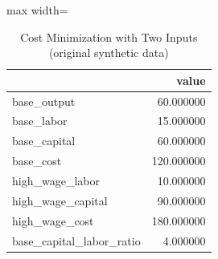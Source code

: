 \begin{table}[htbp]
\centering
\caption{Cost Minimization with Two Inputs (original synthetic data)}
\begingroup
\small
\setlength{\tabcolsep}{6pt}
\renewcommand{\arraystretch}{1.12}
\begin{adjustbox}{max width=\linewidth}
\begin{tabular}{@{}lr@{}}
\toprule
 & value \\
\midrule
base\_output & 60.000000 \\
base\_labor & 15.000000 \\
base\_capital & 60.000000 \\
base\_cost & 120.000000 \\
high\_wage\_labor & 10.000000 \\
high\_wage\_capital & 90.000000 \\
high\_wage\_cost & 180.000000 \\
base\_capital\_labor\_ratio & 4.000000 \\
\bottomrule
\end{tabular}
\end{adjustbox}
\endgroup
\end{table}